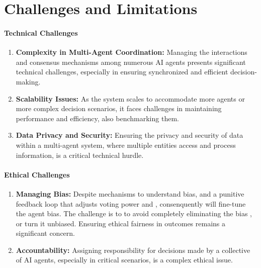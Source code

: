 \documentclass{article}
\begin{document}
\hypertarget{challenges-and-limitations}{%
\section*{Challenges and
Limitations}\label{challenges-and-limitations}}

\hypertarget{technical-challenges}{%
\paragraph{Technical Challenges}\label{technical-challenges}}

\begin{enumerate}
\def\labelenumi{\arabic{enumi}.}
\item
  \textbf{Complexity in Multi-Agent Coordination:} Managing the
  interactions and consensus mechanisms among numerous AI agents
  presents significant technical challenges, especially in ensuring
  synchronized and efficient decision-making.\cite{agasheYear}
\item
  \textbf{Scalability Issues:} As the system scales to accommodate more
  agents or more complex decision scenarios, it faces challenges in
  maintaining performance and efficiency, also benchmarking them\cite{zhuYear}.
\item
  \textbf{Data Privacy and Security:} Ensuring the privacy and security
  of data within a multi-agent system, where multiple entities access
  and process information, is a critical technical hurdle\cite{hallyburtonYear}.
\end{enumerate}

\hypertarget{ethical-challenges}{%
\paragraph{Ethical Challenges}\label{ethical-challenges}}

\begin{enumerate}
\def\labelenumi{\arabic{enumi}.}
\item
  \textbf{Managing Bias:} Despite mechanisms to understand bias, and a
  punitive feedback loop that adjusts voting power and , consenquently
  will fine-tune the agent bias. The challenge is to to avoid completely
  eliminating the bias , or turn it unbiased. Ensuring ethical fairness
  in outcomes remains a significant concern.
\item
  \textbf{Accountability:} Assigning responsibility for decisions made
  by a collective of AI agents, especially in critical scenarios, is a
  complex ethical issue.
\end{enumerate}
\end{document}
